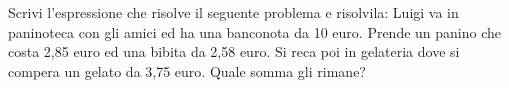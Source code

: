 \item Scrivi l'espressione che risolve il seguente problema e risolvila: Luigi va in paninoteca con gli amici ed ha una banconota da 10 euro. Prende un panino che costa 2,85 euro ed una bibita da 2,58 euro. Si reca poi in gelateria dove si compera un gelato da 3,75 euro. Quale somma gli rimane?
